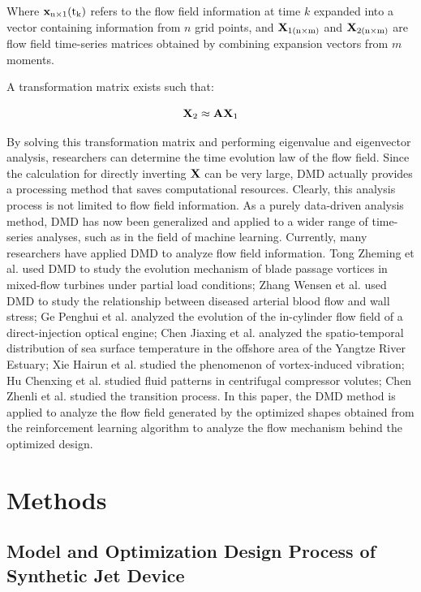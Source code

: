 \documentclass{article}
\begin{document}
Where $\rm\textbf{x}_{n\times1}(t_{k})$ refers to the flow field information at time $k$ expanded into a vector containing information from $n$ grid points, and $\rm\textbf{X}_{1(n\times m)}$ and $\rm\textbf{X}_{2(n\times m)}$ are flow field time-series matrices obtained by combining expansion vectors from $m$ moments.

A transformation matrix exists such that:

$$\rm\textbf{X}_{2}\approx \rm\textbf{AX}_{1}$$

By solving this transformation matrix and performing eigenvalue and eigenvector analysis, researchers can determine the time evolution law of the flow field.
Since the calculation for directly inverting $\rm\textbf{X}$ can be very large, DMD actually provides a processing method that saves computational resources.
Clearly, this analysis process is not limited to flow field information.
As a purely data-driven analysis method, DMD has now been generalized and applied to a wider range of time-series analyses, such as in the field of machine learning.
Currently, many researchers have applied DMD to analyze flow field information.
Tong Zheming et al. used DMD to study the evolution mechanism of blade passage vortices in mixed-flow turbines under partial load conditions;
Zhang Wensen et al. used DMD to study the relationship between diseased arterial blood flow and wall stress;
Ge Penghui et al. analyzed the evolution of the in-cylinder flow field of a direct-injection optical engine;
Chen Jiaxing et al. analyzed the spatio-temporal distribution of sea surface temperature in the offshore area of the Yangtze River Estuary;
Xie Hairun et al. studied the phenomenon of vortex-induced vibration;
Hu Chenxing et al. studied fluid patterns in centrifugal compressor volutes;
Chen Zhenli et al. studied the transition process.
In this paper, the DMD method is applied to analyze the flow field generated by the optimized shapes obtained from the reinforcement learning algorithm to analyze the flow mechanism behind the optimized design.

\section*{Methods}
\addtocounter{section}{1}
\setcounter{subsection}{0}
\indent

\subsection{Model and Optimization Design Process of Synthetic Jet Device}\indent
\end{document}
